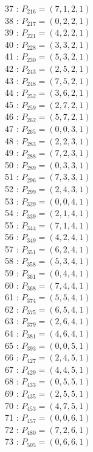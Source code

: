 \documentclass{article}
\begin{document}
{\begin{multicols}{3}
37 : $P_{216}=( 7, 1, 2, 1 )$\\
38 : $P_{217}=( 0, 2, 2, 1 )$\\
39 : $P_{221}=( 4, 2, 2, 1 )$\\
40 : $P_{228}=( 3, 3, 2, 1 )$\\
41 : $P_{230}=( 5, 3, 2, 1 )$\\
42 : $P_{243}=( 2, 5, 2, 1 )$\\
43 : $P_{248}=( 7, 5, 2, 1 )$\\
44 : $P_{252}=( 3, 6, 2, 1 )$\\
45 : $P_{259}=( 2, 7, 2, 1 )$\\
46 : $P_{262}=( 5, 7, 2, 1 )$\\
47 : $P_{265}=( 0, 0, 3, 1 )$\\
48 : $P_{283}=( 2, 2, 3, 1 )$\\
49 : $P_{288}=( 7, 2, 3, 1 )$\\
50 : $P_{289}=( 0, 3, 3, 1 )$\\
51 : $P_{296}=( 7, 3, 3, 1 )$\\
52 : $P_{299}=( 2, 4, 3, 1 )$\\
53 : $P_{329}=( 0, 0, 4, 1 )$\\
54 : $P_{339}=( 2, 1, 4, 1 )$\\
55 : $P_{344}=( 7, 1, 4, 1 )$\\
56 : $P_{349}=( 4, 2, 4, 1 )$\\
57 : $P_{351}=( 6, 2, 4, 1 )$\\
58 : $P_{358}=( 5, 3, 4, 1 )$\\
59 : $P_{361}=( 0, 4, 4, 1 )$\\
60 : $P_{368}=( 7, 4, 4, 1 )$\\
61 : $P_{374}=( 5, 5, 4, 1 )$\\
62 : $P_{375}=( 6, 5, 4, 1 )$\\
63 : $P_{379}=( 2, 6, 4, 1 )$\\
64 : $P_{381}=( 4, 6, 4, 1 )$\\
65 : $P_{393}=( 0, 0, 5, 1 )$\\
66 : $P_{427}=( 2, 4, 5, 1 )$\\
67 : $P_{429}=( 4, 4, 5, 1 )$\\
68 : $P_{433}=( 0, 5, 5, 1 )$\\
69 : $P_{435}=( 2, 5, 5, 1 )$\\
70 : $P_{453}=( 4, 7, 5, 1 )$\\
71 : $P_{457}=( 0, 0, 6, 1 )$\\
72 : $P_{480}=( 7, 2, 6, 1 )$\\
73 : $P_{505}=( 0, 6, 6, 1 )$\\

\end{multicols}}
\end{document}
